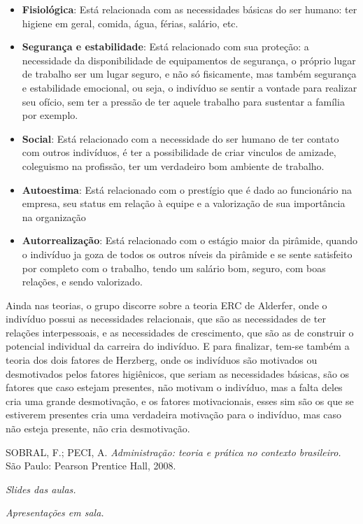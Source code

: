 \documentclass[oneside]{book}
\newcommand\tab[1][1cm]{\hspace*{#1}}
\theoremstyle{definition}
\begin{document}
        \begin{itemize}
            \item \textbf{Fisiológica}: Está relacionada com as necessidades básicas do ser humano: ter higiene em geral, comida, água, férias, salário, etc.
            \item \textbf{Segurança e estabilidade}: Está relacionado com sua proteção: a necessidade da disponibilidade de equipamentos de segurança, o próprio lugar de trabalho ser um lugar seguro, e não só fisicamente, mas também segurança e estabilidade emocional, ou seja, o indivíduo se sentir a vontade para realizar seu ofício, sem ter a pressão de ter aquele trabalho para sustentar a família por exemplo.
            \item \textbf{Social}: Está relacionado com a necessidade do ser humano de ter contato com outros indivíduos, é ter a possibilidade de criar vinculos de amizade, coleguismo na profissão, ter um verdadeiro bom ambiente de trabalho.
            \item \textbf{Autoestima}: Está relacionado com o prestígio que é dado ao funcionário na empresa, seu status em relação à equipe e a valorização de sua importância na organização
            \item \textbf{Autorrealização}: Está relacionado com o estágio maior da pirâmide, quando o indivíduo ja goza de todos os outros níveis da pirâmide e se sente satisfeito por completo com o trabalho, tendo um salário bom, seguro, com boas relações, e sendo valorizado.
        \end{itemize}
        \tab Ainda nas teorias, o grupo discorre sobre a teoria ERC de Alderfer, onde o indivíduo possui as necessidades relacionais, que são as necessidades de ter relações interpessoais, e as necessidades de crescimento, que são as de construir o potencial individual da carreira do indivíduo. E para finalizar, tem-se também a teoria dos dois fatores de Herzberg, onde os indivíduos são motivados ou desmotivados pelos fatores higiênicos, que seriam as necessidades básicas, são os fatores que caso estejam presentes, não motivam o indivíduo, mas a falta deles cria uma grande desmotivação, e os fatores motivacionais, esses sim são os que se estiverem presentes cria uma verdadeira motivação para o indivíduo, mas caso não esteja presente, não cria desmotivação.
        
           
        \begin{thebibliography}{9}
                SOBRAL, F.; PECI, A. 
            \textit{Administração: teoria e prática no contexto brasileiro.}
                São Paulo: Pearson Prentice Hall, 2008.
        
                \textit{Slides das aulas.}
            
                \textit{Apresentações em sala.}
         
        \end{thebibliography}


	        
\end{document}
